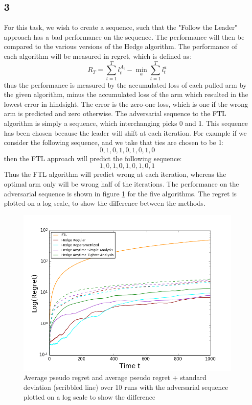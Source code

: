 \documentclass{article}
\begin{document}
\subsection{3}
For this task, we wish to create a sequence, such that the "Follow the Leader" approach has a bad performance on the sequence. The performance will then be compared to the various versions of the Hedge algorithm. The performance of each algorithm will be measured in regret, which is defined as:
\begin{equation}
R_T = \sum\limits_{t=1}^T l_t^{A_t} - \min_{a} \sum\limits_{t=1}^T l_t^{a}
\end{equation}
thus the performance is measured by the accumulated loss of each pulled arm by the given algorithm, minus the accumulated loss of the arm which resulted in the lowest error in hindsight. The error is the zero-one loss, which is one if the wrong arm is predicted and zero otherwise. The adversarial sequence to the FTL algorithm is simply a sequence, which interchanging picks 0 and 1. This sequence has been chosen because the leader will shift at each iteration. For example if we consider the following sequence, and we take that ties are chosen to be 1:
$$
0,1,0,1,0,1,0,1,0
$$
then the FTL approach will predict the following sequence:
$$
1,0,1,0,1,0,1,0,1
$$
Thus the FTL algorithm will predict wrong at each iteration, whereas the optimal arm only will be wrong half of the iterations. The performance on the adversarial sequence is shown in figure \ref{fig:4} for the five algorithms. The regret is plotted on a log scale, to show the difference between the methods.
\begin{figure}[H]
 \centering
  \includegraphics[width=17cm]{fig/adv.png}
  \caption{\footnotesize Average pseudo regret and average pseudo regret + standard deviation (scribbled line) over 10 runs with the adversarial sequence plotted on a log scale to show the difference }
\label{fig:4}
\end{figure}
\end{document}
